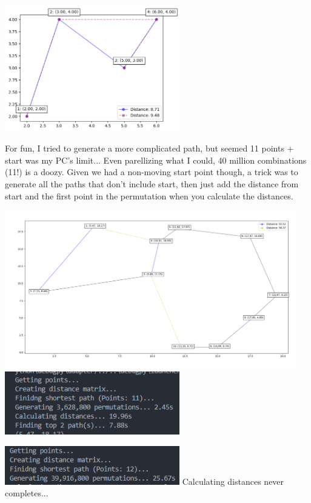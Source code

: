 \documentclass{article}
\begin{document}
    \begin{center}
        \includegraphics[width=3in]{TSP.png}
    \end{center}

    \raggedright
    For fun, I tried to generate a more complicated path, but seemed 11 points + start was my PC's limit... Even parellizing what I could, 40 million combinations (11!) is a doozy.
    Given we had a non-moving start point though, a trick was to generate all the paths that don't include start, then just add the distance from start and the first point in the permutation when you calculate the distances. 

    \begin{center}
        \includegraphics[width=5in]{TSP 11 points.png} \break
        \includegraphics[width=3in]{TSP 11 points console.png} \break

        \includegraphics[width=3in]{TSP 12 points console.png} \break
        Calculating distances never completes...
    \end{center}
        
\end{document}
